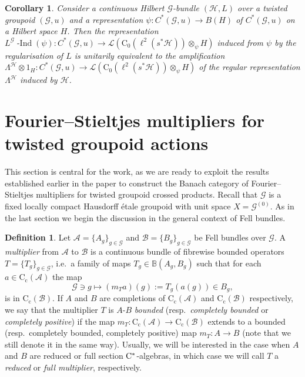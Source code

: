 \documentclass[11 pt, leqno]{amsart}
\numberwithin{equation}{section}
\theoremstyle{plain}
\newtheorem{cor}[thm]{Corollary}
\theoremstyle{definition}
\newtheorem {defn}[thm] {Definition}
\newcommand*{\contc}{\mathrm{C_c}}%
\newcommand*{\contz}{\mathrm{C_0}}%
\DeclareMathOperator{\dashind}{-Ind}
\renewcommand{\H}{\mathcal H}
\newcommand{\B}{\mathcal B}
\newcommand{\BB}{\mathbb B}
\newcommand{\LL}{\mathcal L}
\newcommand{\m}{m}
\newcommand{\G}{\mathcal G} %
\newcommand{\A}{\mathcal A}
\newcommand{\cst}{\ifmmode\mathrm{C}^*\else{$\mathrm{C}^*$}\fi}
\begin{document}
\begin{cor}
Consider a continuous Hilbert $\G$-bundle $(\H, L)$ over a twisted groupoid $(\G,u)$ and a representation $\psi\colon C^*(\G,u) \to B(H)$ of $C^*(\G,u)$ on a Hilbert space $H$. 
Then the representation $L^\G\dashind(\psi): C^*(\G,u) \to \LL(\contz(\ell^2(s^*\H))\otimes_{\psi} H)$ induced from $\psi$ by the regularisation of $L$ is unitarily equivalent to the amplification $\Lambda^{\H}\otimes 1_{H} : C^*(\G,u) \to \LL(\contz(\ell^2(s^*\H)) \otimes_{\psi} H)$ of the regular representation $\Lambda^{\H}$ induced by $\H$. 
\end{cor}



%
%
\section{Fourier--Stieltjes multipliers for twisted groupoid actions}
\label{Sec:FSmultipliers}

This section is central for the work, as we are ready to exploit the results established earlier in the paper to construct the Banach category of Fourier--Stieltjes multipliers for twisted groupoid crossed products. 
Recall that $\G$ is a fixed locally compact Hausdorff \'etale groupoid with unit space $X=\G^{(0)}$. 
As in the last section we begin the discussion in the general context of Fell bundles.

\begin{defn}\label{de:MultiplierFellBundle}
Let $\A = \{ A_g \}_{g \in \G}$ and $\B = \{ B_g \}_{g \in \G}$ be Fell bundles over $\G$. 
A \emph{multiplier} from $\A$ to $\B$ is a continuous bundle of fibrewise bounded operators $T=\{T_g\}_{g\in \G}$, i.e.\ a family of maps $T_{g}\in \BB(A_g, B_g)$ such that for each $a\in \contc(\A)$ the map
\begin{equation}\label{eq:multiplier_map_defn}
    \G\ni  g \longmapsto (\m_Ta)(g) := T_{g}(a(g))\in B_{g},
\end{equation}
is in $\contc(\B)$. 
If $A$ and $B$ are completions of $\contc(\A)$ and $\contc(\B)$ respectively, we  say that the multiplier $T$ is  $A$-$B$ \emph{bounded} (resp.\ \emph{completely bounded} or \emph{completely positive}) if the map $\m_{T}:\contc(\A)\to \contc(\B)$ extends to a bounded (resp.\ completely bounded, completely positive) map $\m_{T}:A\to B$ (note that we still denote it in the same way).
Usually, we will be interested in the case when $A$ and $B$ are reduced or full section $\cst$-algebras, in which case we will call $T$ a \emph{reduced} or \emph{full multiplier}, respectively. 
\end{defn}
\end{document}
